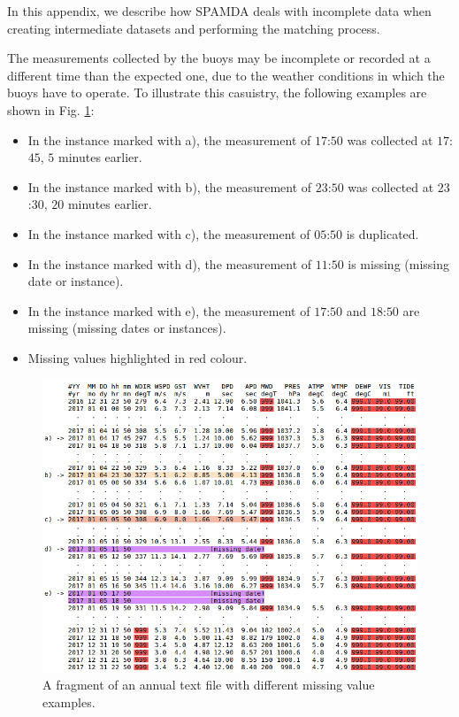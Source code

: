 \documentclass[energies,article,submit,moreauthors,pdftex]{Definitions/mdpi}
\begin{document}
		In this appendix, we describe how SPAMDA deals with incomplete data when creating intermediate datasets and performing the matching process.
		
		The measurements collected by the buoys may be incomplete or recorded at a different time than the expected one, due to the weather conditions in which the buoys have to operate. To illustrate this casuistry, the following examples are shown in Fig. \ref{fig:measurements}:		
		\begin{itemize}
			\item In the instance marked with a), the measurement of $17$:$50$ was collected at $17$:$45$, $5$ minutes earlier.
			\item In the instance marked with b), the measurement of $23$:$50$ was collected at $23$:$30$, $20$ minutes earlier.
			\item In the instance marked with c), the measurement of $05$:$50$ is duplicated.
			\item In the instance marked with d), the measurement of $11$:$50$ is missing (missing date or instance).
			\item In the instance marked with e), the measurement of $17$:$50$ and $18$:$50$ are missing (missing dates or instances).
			\item Missing values highlighted in red colour.
		\end{itemize}
		
		\begin{figure}[ht!]
			\centering
			\includegraphics[scale=0.45]{figures/FigureMeasurements.png}
			\caption{A fragment of an annual text file with different missing value examples.}
			\label{fig:measurements}
		\end{figure}
		
\end{document}
